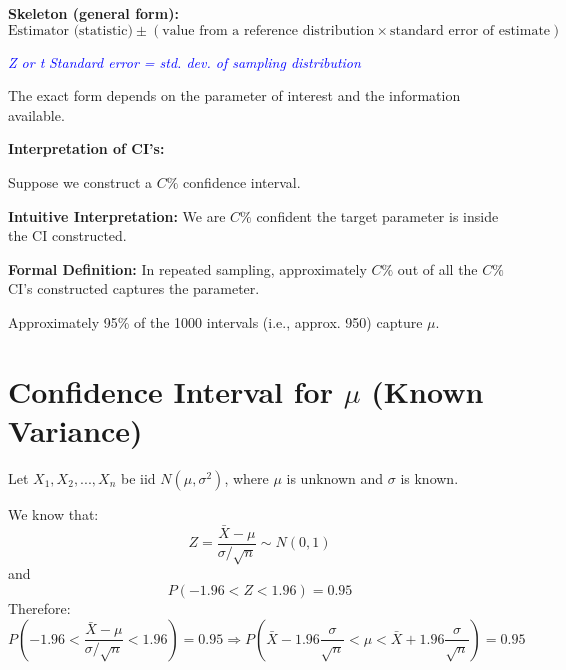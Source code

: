 \vspace{2em}

\noindent
\textbf{Skeleton (general form):}
\[
\text{Estimator (statistic)} \pm \left( \text{value from a reference distribution} \times \text{standard error of estimate} \right)
\]

\vspace{0.5em}
\textcolor{blue}{\textit{Z or t} \hspace{1em} \textit{Standard error = std. dev. of sampling distribution}}

\vspace{1em}
The exact form depends on the parameter of interest and the information available.

\vspace{2em}

\textbf{Interpretation of CI’s:}

Suppose we construct a $C\%$ confidence interval.

\vspace{0.5em}
\textbf{Intuitive Interpretation:} We are $C\%$ confident the target parameter is inside the CI constructed.

\vspace{0.5em}
\textbf{Formal Definition:} In repeated sampling, approximately $C\%$ out of all the $C\%$ CI’s constructed captures the parameter.


\vspace{2em}

\begin{center}
\begin{center}
\end{center}

\end{center}

\vspace{0.5em}
Approximately 95\% of the 1000 intervals (i.e., approx. 950) capture $\mu$.
\section{Confidence Interval for $\mu$ (Known Variance)}

Let $X_1, X_2, ..., X_n$ be iid $N(\mu, \sigma^2)$, where $\mu$ is unknown and $\sigma$ is known.

We know that:
\[
Z = \frac{\bar{X} - \mu}{\sigma / \sqrt{n}} \sim N(0, 1)
\]
and
\[
P(-1.96 < Z < 1.96) = 0.95
\]
Therefore:
\[
P\left( -1.96 < \frac{\bar{X} - \mu}{\sigma / \sqrt{n}} < 1.96 \right) = 0.95
\Rightarrow P\left( \bar{X} - 1.96 \frac{\sigma}{\sqrt{n}} < \mu < \bar{X} + 1.96 \frac{\sigma}{\sqrt{n}} \right) = 0.95
\]

